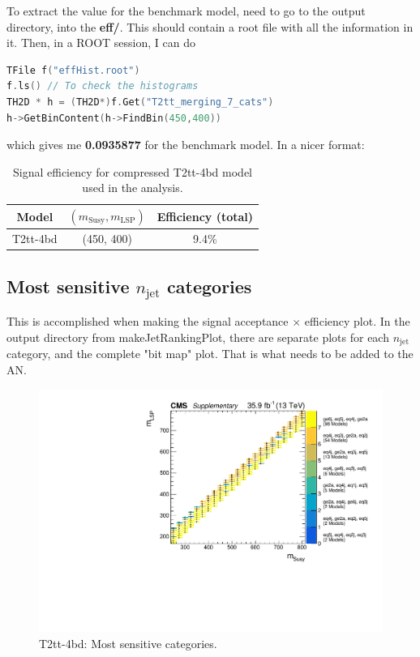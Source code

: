 To extract the value for the benchmark model, need to go to the output directory, into the \textbf{eff/}. This should contain a root file with all the information in it. Then, in a ROOT session, I can do

\begin{lstlisting}[belowskip=-0.7cm, language=C++, numbers=none]
TFile f("effHist.root")
f.ls() // To check the histograms
TH2D * h = (TH2D*)f.Get("T2tt_merging_7_cats")
h->GetBinContent(h->FindBin(450,400))
\end{lstlisting}

which gives me \textbf{0.0935877} for the benchmark model. In a nicer format:

\begin{table}[H]
    \caption{Signal efficiency for compressed T2tt-4bd model used in the analysis.}
    \label{tab:sig-effT2ttBenchmark}
    \centering
    \begin{tabular}{ ccc }
        \hline \hline
        Model & $(m_{\mathrm{Susy}},m_{\mathrm{LSP}})$ & Efficiency (total) \\
        \hline
        T2tt-4bd & (450, 400) & 9.4\% \\
        \hline \hline
        \end{tabular}
        \end{table}


\subsection{Most sensitive \texorpdfstring{$n_{\mathrm{jet}}$}{njet} categories}

This is accomplished when making the signal acceptance $\times$ efficiency plot. In the output directory from makeJetRankingPlot, there are separate plots for each $n_{\mathrm{jet}}$ category, and the complete "bit map" plot. That is what needs to be added to the AN.

\begin{figure}[H]
\centering
\includegraphics[width=120mm]{./sec31/T2tt_bitMap_improved.pdf}
\caption{T2tt-4bd: Most sensitive categories.}
\end{figure}


